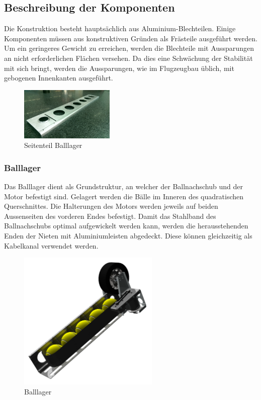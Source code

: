 \clearpage
\subsection{Beschreibung der Komponenten}
Die Konstruktion besteht hauptsächlich aus Aluminium-Blechteilen. Einige 
Komponenten müssen aus konstruktiven Gründen als Frästeile ausgeführt werden. 
Um ein geringeres Gewicht zu erreichen, werden die Blechteile mit Aussparungen 
an nicht erforderlichen Flächen versehen. Da dies eine Schwächung der 
Stabilität mit sich bringt, werden die Aussparungen, wie im Flugzeugbau 
üblich, mit gebogenen Innenkanten ausgeführt.

\begin{figure}[h!]
    \centering
    \includegraphics[width=0.4\textwidth]{fig/IMAG0364.jpg}
    \caption{Seitenteil Balllager}
    \label{fig:balllager_side}
\end{figure}

\subsubsection{Balllager}
\label{sec:balllager}
Das Balllager dient als Grundstruktur, an welcher der Ballnachschub und der 
Motor befestigt sind. Gelagert werden die Bälle im Inneren des quadratischen 
Querschnittes. Die Halterungen des Motors werden jeweils auf beiden 
Aussenseiten des vorderen Endes befestigt. Damit das Stahlband des 
Ballnachschubs optimal aufgewickelt werden kann, werden die herausstehenden 
Enden der Nieten mit Aluminiumleisten abgedeckt. Diese können gleichzeitig als 
Kabelkanal verwendet werden. 

\begin{figure}[h!]
    \centering
    \includegraphics[width=0.6\textwidth, trim=0 10 0 10, clip=true]{fig/15.png}
    \caption{Balllager}
    \label{fig:balllager}
\end{figure}

